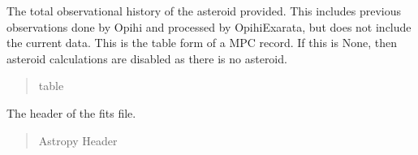 \documentclass[letterpaper,11pt,english]{sphinxmanual}
\begin{document}
\begin{savenotes}
\begin{fulllineitems}
\begin{savenotes}
\begin{fulllineitems}
\end{fulllineitems}\end{savenotes}


\begin{savenotes}\begin{fulllineitems}
\label{\detokenize{code/opihiexarata.opihi.solution:opihiexarata.opihi.solution.OpihiSolution.asteroid_observations}}
\pysigstartsignatures
{}
\pysigstopsignatures
\sphinxAtStartPar
The total observational history of the asteroid provided. This includes
previous observations done by Opihi and processed by OpihiExarata, but
does not include the current data. This is the table form of a MPC
record. If this is None, then asteroid calculations are disabled as
there is no asteroid.
\begin{quote}\begin{description}
\sphinxAtStartPar
table

\end{description}\end{quote}

\end{fulllineitems}\end{savenotes}


\begin{savenotes}\begin{fulllineitems}
\label{\detokenize{code/opihiexarata.opihi.solution:opihiexarata.opihi.solution.OpihiSolution.header}}
\pysigstartsignatures
{}
\pysigstopsignatures
\sphinxAtStartPar
The header of the fits file.
\begin{quote}\begin{description}
\sphinxAtStartPar
Astropy Header

\end{description}\end{quote}

\end{fulllineitems}\end{savenotes}


\end{fulllineitems}
\end{savenotes}
\end{document}
